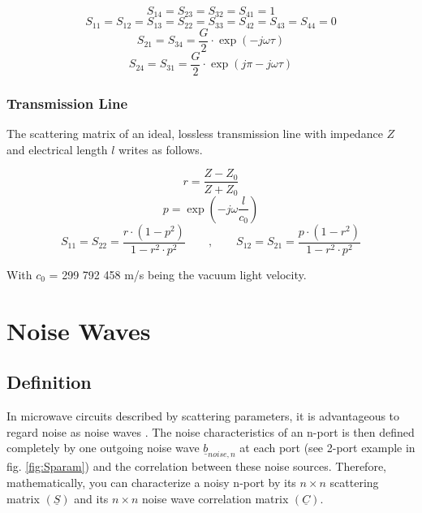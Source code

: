 \documentclass[10pt]{report}
\begin{document}
\begin{equation}
S_{14} = S_{23} = S_{32} = S_{41} = 1
\end{equation}
\begin{equation}
S_{11} = S_{12} = S_{13} = S_{22} = S_{33} = S_{42} = S_{43} = S_{44} = 0
\end{equation}
\begin{equation}
S_{21} = S_{34} = \frac{G}{2}\cdot \exp(-j\omega\tau)
\end{equation}
\begin{equation}
S_{24} = S_{31} = \frac{G}{2}\cdot \exp(j\pi-j\omega\tau)
\end{equation}

\subsection{Transmission Line}

The scattering matrix of an ideal, lossless transmission line with
impedance $Z$ and electrical length $l$ writes as follows.

\begin{equation}
r = \frac{Z-Z_0}{Z+Z_0}
\end{equation}
\begin{equation}
p = \exp(-j\omega\frac{l}{c_0})
\end{equation}
\begin{equation}
S_{11} = S_{22} = \frac{r\cdot(1-p^2)}{1-r^2\cdot p^2} \qquad,\qquad
S_{12} = S_{21} = \frac{p\cdot(1-r^2)}{1-r^2\cdot p^2}
\end{equation}

With $c_0$ = 299 792 458 m/s being the vacuum light velocity.


\chapter{Noise Waves}

\section{Definition}

In microwave circuits described by scattering parameters, it is
advantageous to regard noise as noise waves \cite{Wedge}.  The noise
characteristics of an n-port is then defined completely by one
outgoing noise wave $\underline{b}_{noise,n}$ at each port (see 2-port
example in fig. \ref{fig:Sparam}) and the correlation between these
noise sources.  Therefore, mathematically, you can characterize a
noisy n-port by its $n\times n$ scattering matrix $(\underline{S})$
and its $n\times n$ noise wave correlation matrix $(\underline{C})$.
\end{document}
